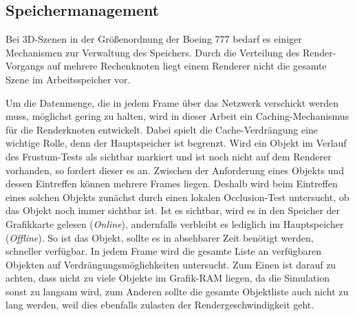 \subsection{Speichermanagement}
\label{sec:basics:speicher}
Bei 3D-Szenen in der Größenordnung der Boeing 777 bedarf es einiger Mechanismen zur Verwaltung des Speichers. Durch die Verteilung des Render-Vorgangs auf mehrere Rechenknoten liegt einem Renderer nicht die gesamte Szene im Arbeitsspeicher vor. 

Um die Datenmenge, die in jedem Frame über das Netzwerk verschickt werden muss, möglichst gering zu halten, wird in dieser Arbeit ein Caching-Mechanismus für die Renderknoten entwickelt. Dabei spielt die Cache-Verdrängung eine wichtige Rolle, denn der Hauptspeicher ist begrenzt. Wird ein Objekt im Verlauf des Frustum-Tests als sichtbar markiert und ist noch nicht auf dem Renderer vorhanden, so fordert dieser es an. Zwischen der Anforderung eines Objekts und dessen Eintreffen können mehrere Frames liegen. Deshalb wird beim Eintreffen eines solchen Objekts zunächst durch einen lokalen Occlusion-Test untersucht, ob das Objekt noch immer sichtbar ist. Ist es sichtbar, wird es in den Speicher der Grafikkarte gelesen (\emph{Online}), andernfalls verbleibt es lediglich im Hauptspeicher (\emph{Offline}). So ist das Objekt, sollte es in absehbarer Zeit benötigt werden, schneller verfügbar. In jedem Frame wird die gesamte Liste an verfügbaren Objekten auf Verdrängungsmöglichkeiten untersucht. Zum Einen ist darauf zu achten, dass nicht zu viele Objekte im Grafik-RAM liegen, da die Simulation sonst zu langsam wird, zum Anderen sollte die gesamte Objektliste auch nicht zu lang werden, weil dies ebenfalls zulasten der Rendergeschwindigkeit geht.


